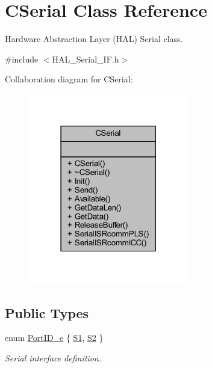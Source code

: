 \hypertarget{class_c_serial}{}\section{C\+Serial Class Reference}
\label{class_c_serial}


Hardware Abstraction Layer (H\+AL) Serial class.  




{\ttfamily \#include $<$H\+A\+L\+\_\+\+Serial\+\_\+\+I\+F.\+h$>$}



Collaboration diagram for C\+Serial\+:\nopagebreak
\begin{figure}[H]
\begin{center}
\leavevmode
\includegraphics[width=198pt]{class_c_serial__coll__graph}
\end{center}
\end{figure}
\subsection*{Public Types}
\begin{DoxyCompactItemize}
\item 
enum \mbox{\hyperlink{class_c_serial_a000039540cc90b18bafacf5744e7eda2}{Port\+I\+D\+\_\+e}} \{ \mbox{\hyperlink{class_c_serial_a000039540cc90b18bafacf5744e7eda2a2a245d3c55e5b6e7052daf261924ce08}{S1}}, 
\mbox{\hyperlink{class_c_serial_a000039540cc90b18bafacf5744e7eda2a8cc95f4591147b0df028e003f82220a1}{S2}}
 \}
\begin{DoxyCompactList}\small\item\em Serial interface definition. \end{DoxyCompactList}\end{DoxyCompactItemize}
